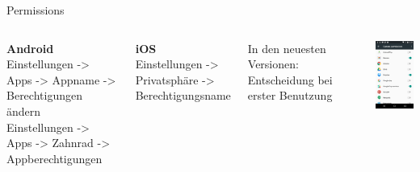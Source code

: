 \documentclass[12pt]{beamer}
\begin{document}
\begin{frame}{Permissions}
  \begin{columns}
    \column{5.5cm}
    \footnotesize

    \textbf{Android}\\
    Einstellungen -> Apps -> Appname -> Berechtigungen ändern\\
    \vspace{0.2cm}
    Einstellungen -> Apps -> Zahnrad -> Appberechtigungen\\
    \vspace{0.5cm}

    \textbf{iOS}\\
    Einstellungen -> Privatsphäre -> Berechtigungsname\\
    \vspace{0.5cm}

    In den neuesten Versionen: Entscheidung bei erster Benutzung

    \column{5cm}

    \begin{center}
      \includegraphics[width=3.5cm]{img/permissions-android.png}
    \par\end{center}
  \end{columns}
\end{frame}
\end{document}
